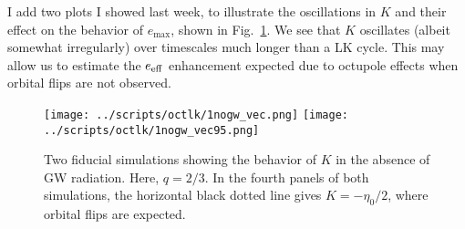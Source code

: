\documentclass[11pt,
        usenames, %
        dvipsnames %
    ]{article}
\begin{document}
I add two plots I showed last week, to illustrate the oscillations in $K$ and
their effect on the behavior of $e_{\max}$, shown in Fig.~\ref{fig:1nogw}. We
see that $K$ oscillates (albeit somewhat irregularly) over timescales much
longer than a LK cycle. This may allow us to estimate the $e_{\rm eff}$
enhancement expected due to octupole effects when orbital flips are not
observed.
\begin{figure}[h]
    \centering
    \texttt{[image: ../scripts/octlk/1nogw\_vec.png]}
    \texttt{[image: ../scripts/octlk/1nogw\_vec95.png]}
    \caption{Two fiducial simulations showing the behavior of $K$ in the absence
    of GW radiation. Here, $q = 2/3$. In the fourth panels of both simulations,
    the horizontal black dotted line gives $K = -\eta_0/2$, where orbital flips
    are expected.}\label{fig:1nogw}
\end{figure}
\end{document}
